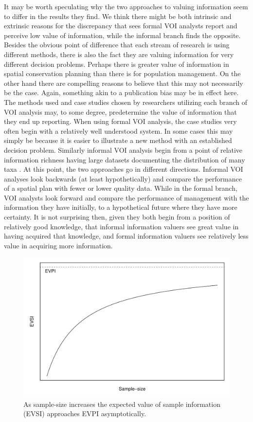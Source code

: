 \documentclass[]{article}
\theoremstyle{definition}
\theoremstyle{definition}
\theoremstyle{definition}
\theoremstyle{remark}
\begin{document}
It may be worth speculating why the two approaches to valuing
information seem to differ in the results they find. We think there
might be both intrinsic and extrinsic reasons for the discrepancy that
sees formal VOI analysts report and perceive low value of information,
while the informal branch finds the opposite. Besides the obvious point
of difference that each stream of research is using different methods,
there is also the fact they are valuing information for very different
decision problems. Perhaps there is greater value of information in
spatial conservation planning than there is for population management.
On the other hand there are compelling reasons to believe that this may
not necessarily be the case. Again, something akin to a publication bias
may be in effect here. The methods used and case studies chosen by
researchers utilizing each branch of VOI analysis may, to some degree,
predetermine the value of information that they end up reporting. When
using formal VOI analysis, the case studies very often begin with a
relatively well understood system. In some cases this may simply be
because it is easier to illustrate a new method with an established
decision problem. Similarly informal VOI analysis begin from a point of
relative information richness having large datasets documenting the
distribution of many taxa \citep[e.g.,][]{Grantham2008, Hermoso2013}. At
this point, the two approaches go in different directions. Informal VOI
analyses look backwards (at least hypothetically) and compare the
performance of a spatial plan with fewer or lower quality data. While in
the formal branch, VOI analysts look forward and compare the performance
of management with the information they have initially, to a
hypothetical future where they have more certainty. It is not surprising
then, given they both begin from a position of relatively good
knowledge, that informal information valuers see great value in having
acquired that knowledge, and formal information valuers see relatively
less value in acquiring more information.




\begin{figure}[htbp]
\centering
\includegraphics{voiReview_files/figure-latex/dimretplot-1.pdf}
\caption{\label{fig:dimretplot}As sample-size increases the expected value of sample
information (EVSI) approaches EVPI asymptotically.}
\end{figure}
\end{document}
